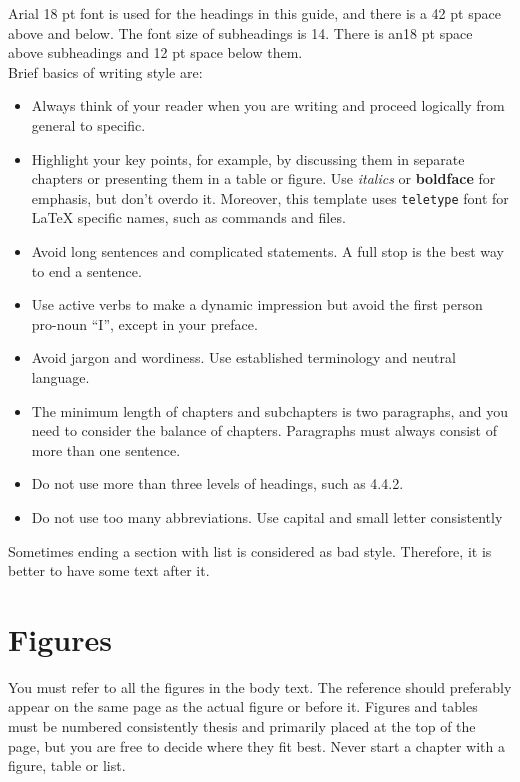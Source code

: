 \documentclass[12pt,a4paper,english
]{tunithesis}
\begin{document}
Arial 18 pt font is used for the headings in this guide, and there is
a 42 pt space above and below. The font size of subheadings is
14. There is an18 pt space above subheadings and 12 pt space below
them.
\\
Brief basics of writing style are:
\begin{itemize}
\item Always think of your reader when you are writing and proceed
  logically from general to specific.
\item Highlight your key points, for example, by discussing them in
  separate chapters or presenting them in a table or figure. Use
  \textit{italics} or \textbf{boldface} for emphasis, but don't overdo
  it.  Moreover, this template uses \texttt{teletype} font for LaTeX
  specific names, such as commands and files.
\item Avoid long sentences and complicated statements. A full stop is
  the best way to end a sentence.
\item Use active verbs to make a dynamic impression but avoid the
  first person pro-noun ``I'', except in your preface.
\item Avoid jargon and wordiness. Use established terminology and
  neutral language.
\item The minimum length of chapters and subchapters is two
  paragraphs, and you need to consider the balance of
  chapters. Paragraphs must always consist of more than one sentence.
\item Do not use more than three levels of headings, such as 4.4.2.
\item Do not use too many abbreviations. Use capital and small letter
  consistently
\end{itemize}

Sometimes ending a section with list is considered as bad
style. Therefore, it is better to have some text after it.


\section{Figures}
You must refer to all the figures in the body text. The reference
should preferably appear on the same page as the actual figure or
before it. Figures and tables must be numbered consistently thesis
and primarily placed at the top of the page, but you are free to
decide where they fit best. Never start a chapter with a figure, table
or list.
\end{document}
